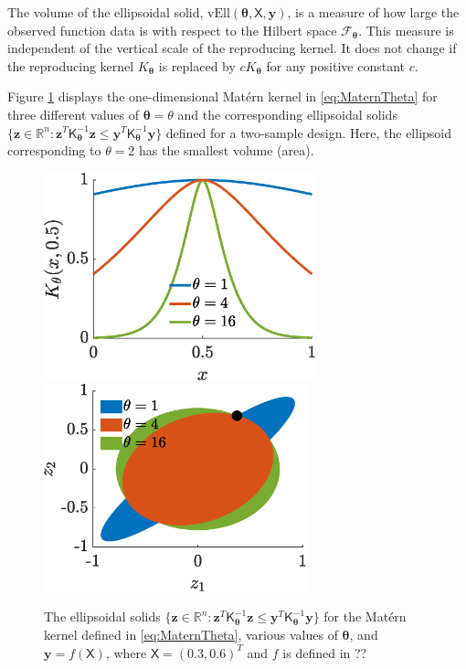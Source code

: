 \documentclass[]{mcom-l}
\theoremstyle{theorem}
\theoremstyle{remark}
\newcommand{\vEll}{\text{vEll}}
\newcommand{\reals}{{\mathbb{R}}}
\newcommand{\mK}{\mathsf{K}}
\newcommand{\mX}{\mathsf{X}}
\newcommand{\by}{{\boldsymbol{y}}}
\newcommand{\bz}{{\boldsymbol{z}}}
\newcommand{\btheta}{{\boldsymbol{\theta}}}
\newcommand{\calf}{{\mathcal{F}}}
\begin{document}
The volume of the ellipsoidal solid, $\vEll(\btheta,\mX,\by)$, is a measure of how large the observed function data is with respect to the Hilbert space $\calf_{\btheta}$.  This measure is independent of the vertical scale of the reproducing kernel.  It does not change if the reproducing kernel $K_\btheta$ is replaced by $cK_{\btheta}$ for any positive constant $c$.  

Figure \ref{fig:ellipPlot} displays the one-dimensional Mat\'ern kernel in \eqref{eq:MaternTheta} for three different values of $\btheta = \theta$ and the corresponding  ellipsoidal solids $\{ \bz \in \reals^n : \bz^T \mK_\btheta^{-1} \bz \le \by^T \mK_\btheta^{-1} \by  \bigr \}$  defined for a two-sample design.  Here, the ellipsoid corresponding to $\theta = 2$ has the smallest volume (area).


\begin{figure}[H]
	\centering
	\includegraphics[height = 6cm]{ProgramsImages/GaussKthetaPlot.eps} \qquad
	\includegraphics[height = 6cm]{ProgramsImages/ellipsesGaussPlot.eps}
	\caption{The ellipsoidal solids $\{ \bz \in \reals^n : \bz^T \mK_\btheta^{-1} \bz \le \by^T \mK_\btheta^{-1} \by  \bigr \}$ for the Mat\'ern kernel defined in \eqref{eq:MaternTheta}, various values of $\btheta$, and $\by = f(\mX)$, where $\mX = (0.3, 0.6)^T$ and $f$ is defined in ?? \label{fig:ellipPlot}}
\end{figure}
\end{document}
